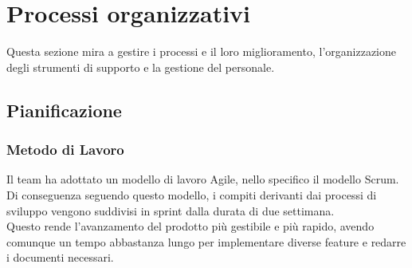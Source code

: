 \section{Processi organizzativi}
Questa sezione mira a gestire i processi e il loro miglioramento, l'organizzazione degli strumenti
di supporto e la gestione del personale.


    \subsection{Pianificazione}
        \subsubsection{Metodo di Lavoro}
        Il team ha adottato un modello di lavoro Agile, nello specifico il modello Scrum.
        Di conseguenza seguendo questo modello, i compiti derivanti dai processi di sviluppo vengono suddivisi in sprint dalla
        durata di due settimana.\\
        Questo rende l'avanzamento del prodotto più gestibile e più rapido, avendo comunque un tempo abbastanza lungo per implementare diverse
        feature e redarre i documenti necessari.

